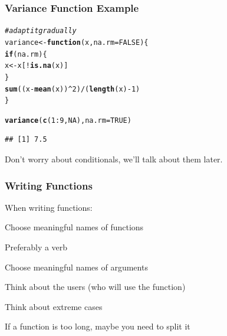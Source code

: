 \documentclass[12pt]{beamer}\usepackage[]{graphicx}\usepackage[]{color}
\makeatletter
\newcommand{\hlnum}[1]{\textcolor[rgb]{0.686,0.059,0.569}{#1}}%
\newcommand{\hlcom}[1]{\textcolor[rgb]{0.678,0.584,0.686}{\textit{#1}}}%
\newcommand{\hlopt}[1]{\textcolor[rgb]{0,0,0}{#1}}%
\newcommand{\hlstd}[1]{\textcolor[rgb]{0.345,0.345,0.345}{#1}}%
\newcommand{\hlkwa}[1]{\textcolor[rgb]{0.161,0.373,0.58}{\textbf{#1}}}%
\newcommand{\hlkwb}[1]{\textcolor[rgb]{0.69,0.353,0.396}{#1}}%
\newcommand{\hlkwc}[1]{\textcolor[rgb]{0.333,0.667,0.333}{#1}}%
\newcommand{\hlkwd}[1]{\textcolor[rgb]{0.737,0.353,0.396}{\textbf{#1}}}%
\newenvironment{kframe}{%
 \def\at@end@of@kframe{}%
 \ifinner\ifhmode%
  \def\at@end@of@kframe{\end{minipage}}%
  \begin{minipage}{\columnwidth}%
 \fi\fi%
 \def\FrameCommand##1{\hskip\@totalleftmargin \hskip-\fboxsep
 \colorbox{shadecolor}{##1}\hskip-\fboxsep
     \hskip-\linewidth \hskip-\@totalleftmargin \hskip\columnwidth}%
 \MakeFramed {\advance\hsize-\width
   \@totalleftmargin\z@ \linewidth\hsize
   \@setminipage}}%
 {\par\unskip\endMakeFramed%
 \at@end@of@kframe}
\newenvironment{knitrout}{}{} %
\makeatother
\begin{document}

\begin{frame}[fragile]
\frametitle{Variance Function Example}

\begin{knitrout}\footnotesize
{}\color{fgcolor}\begin{kframe}
\begin{alltt}
\hlcom{# adapt it gradually}
\hlstd{variance} \hlkwb{<-} \hlkwa{function}\hlstd{(}\hlkwc{x}\hlstd{,} \hlkwc{na.rm} \hlstd{=} \hlnum{FALSE}\hlstd{) \{}
  \hlkwa{if} \hlstd{(na.rm) \{}
    \hlstd{x} \hlkwb{<-} \hlstd{x[}\hlopt{!}\hlkwd{is.na}\hlstd{(x)]}
  \hlstd{\}}
  \hlkwd{sum}\hlstd{((x} \hlopt{-} \hlkwd{mean}\hlstd{(x))}\hlopt{^}\hlnum{2}\hlstd{)} \hlopt{/} \hlstd{(}\hlkwd{length}\hlstd{(x)} \hlopt{-} \hlnum{1}\hlstd{)}
\hlstd{\}}

\hlkwd{variance}\hlstd{(}\hlkwd{c}\hlstd{(}\hlnum{1}\hlopt{:}\hlnum{9}\hlstd{,} \hlnum{NA}\hlstd{),} \hlkwc{na.rm} \hlstd{=} \hlnum{TRUE}\hlstd{)}
\end{alltt}
\begin{verbatim}
## [1] 7.5
\end{verbatim}
\end{kframe}
\end{knitrout}

Don't worry about  conditionals, we'll talk about them later.

\end{frame}


\begin{frame}[fragile]
\frametitle{Writing Functions}

When writing functions:
\bi
  \item Choose meaningful names of functions
  \item Preferably a verb
  \item Choose meaningful names of arguments
  \item Think about the users (who will use the function)
  \item Think about extreme cases
  \item If a function is too long, maybe you need to split it
\ei

\end{frame}

\end{document}
